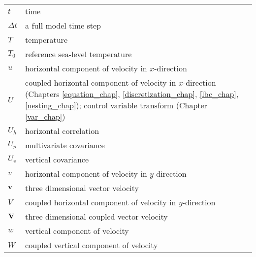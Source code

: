 \begin{tabular}{ l p{5.5in} }
$t$            & time \\
$\Delta t$     & a full model time step \\
$T$            & temperature \\
$T_0$          & reference sea-level temperature \\
$u$            & horizontal component of velocity in $x$-direction \\
$U$            & coupled horizontal component of velocity in $x$-direction (Chapters \ref{equation_chap}, \ref{discretization_chap}, \ref{lbc_chap}, \ref{nesting_chap}); control variable transform (Chapter \ref{var_chap}) \\
$U_h$          & horizontal correlation \\
$U_p$          & multivariate covariance \\
$U_v$          & vertical covariance \\
$v$            & horizontal component of velocity in $y$-direction \\
$\bf v$        & three dimensional vector velocity \\
$V$            & coupled horizontal component of velocity in $y$-direction \\
$\bf V$        & three dimensional coupled vector velocity \\
$w$            & vertical component of velocity \\
$W$            & coupled vertical component of velocity \\

\end{tabular}

